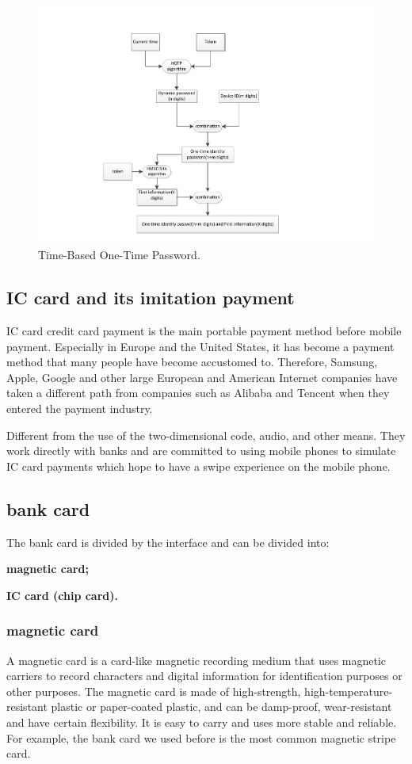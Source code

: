 \documentclass[journal]{IEEEtran}
\begin{document}
\begin{figure}[htbp]
\centerline{\includegraphics[scale=0.65]{TOTP.pdf}}
\caption{Time-Based One-Time Password.}
\label{fig}
\end{figure}


\subsection{IC card and its imitation payment}
IC card credit card payment is the main portable payment method before mobile payment. Especially in Europe and the United States, it has become a payment method that many people have become accustomed to. Therefore, Samsung, Apple, Google and other large European and American Internet companies have taken a different path from companies such as Alibaba and Tencent when they entered the payment industry.

Different from the use of the two-dimensional code, audio, and other means. They work directly with banks and  are committed to using mobile phones to simulate IC card payments which hope to have a swipe experience on the mobile phone.

\subsection{bank card}
The bank card is divided by the interface and can be divided into:

\textbf{magnetic card;}

\textbf{IC card (chip card).}
\subsubsection{magnetic card}
A magnetic card is a card-like magnetic recording medium that uses magnetic carriers to record characters and digital information for identification purposes or other purposes. The magnetic card is made of high-strength, high-temperature-resistant plastic or paper-coated plastic, and can be damp-proof, wear-resistant and have certain flexibility. It is easy to carry and uses more stable and reliable. For example, the bank card we used before is the most common magnetic stripe card.
\end{document}
